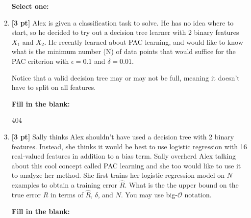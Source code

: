 \documentclass[12pt]{article}
\renewcommand{\circle}{\tikz\draw[black] (0,0) circle (1ex);}
\begin{document}
\begin{enumerate}
    \textbf{Select one:}
    

    \clearpage
    
    \item \textbf{[3 pt]} Alex is given a classification task to solve. He has no idea where to start, so he decided to try out a decision tree learner with 2 binary features $X_1$ and $X_2$. He recently learned about PAC learning, and would like to know what is the minimum number (N) of data points that would suffice for the PAC criterion with $\epsilon = 0.1$ and $\delta = 0.01$. 
    
    Notice that a valid decision tree may or may not be full, meaning it doesn't have to split on all features.
    
    \textbf{Fill in the blank:}
    
    \begin{tcolorbox}[fit,height=1cm, width=4cm, blank, borderline={1pt}{-2pt},nobeforeafter]
    
    \begin{center}\huge404\end{center}
    \end{tcolorbox} 
    
    
    
    \item \textbf{[3 pt]} Sally thinks Alex shouldn't have used a decision tree with 2 binary features. Instead, she thinks it would be best to use logistic regression with 16 real-valued features in addition to a bias term. Sally overherd Alex talking about this cool concept called PAC learning and she too would like to use it to analyze her method. She first trains her logistic regression model on $N$ examples to obtain a training error $\hat R$. What is the the upper bound on the true error $R$ in terms of $\hat R$, $\delta$, and $N$. You may use big-$\mathcal{O}$ notation.
    
    \textbf{Fill in the blank:}
    
    \begin{tcolorbox}[fit,height=1cm, width=15cm, blank, borderline={1pt}{-2pt},nobeforeafter]
    

\end{tcolorbox}
\end{enumerate}
\end{document}
